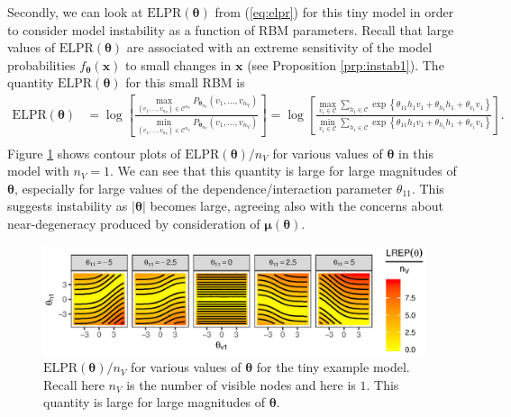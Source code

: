 \documentclass[12pt]{article}
\theoremstyle{definition}
\newcommand{\nv}{{n_{\scriptscriptstyle V}}}
\begin{document}
Secondly, we can look at \(\text{ELPR}(\boldsymbol \theta)\) from
(\eqref{eq:elpr}) for this tiny model in order to consider model
instability as a function of RBM parameters. Recall that large values of
\(\text{ELPR}(\boldsymbol \theta)\) are associated with an extreme
sensitivity of the model probabilities
\(f_{\boldsymbol \theta}(\boldsymbol x)\) to small changes in
\(\boldsymbol x\) (see Proposition \ref{prp:instab1}). The quantity
\(\text{ELPR}(\boldsymbol \theta)\) for this small RBM is
\begin{align*}
\text{ELPR}(\boldsymbol \theta) &= \log \left[\frac{\max\limits_{(v_1, \dots, v_\nv) \in \mathcal{C}^\nv}P_{\boldsymbol \theta_\nv}(v_1, \dots, v_\nv)}{\min\limits_{(v_1, \dots, v_\nv) \in \mathcal{C}^\nv}P_{\boldsymbol \theta_\nv}(v_1, \dots, v_\nv)}\right] = \log \left[\frac{\max\limits_{v_1 \in \mathcal{C}}\sum\limits_{h_1 \in \mathcal{C}}\exp\left\{\theta_{11} h_1 v_1 + \theta_{h_1}h_1 + \theta_{v_1} v_1 \right\}}{\min\limits_{v_1 \in \mathcal{C}}\sum\limits_{h_1 \in \mathcal{C}}\exp\left\{\theta_{11} h_1 v_1 + \theta_{h_1}h_1 + \theta_{v_1} v_1 \right\}}\right]. \\
\end{align*}
Figure \ref{fig:instab} shows contour plots of
\(\text{ELPR}(\boldsymbol \theta)/\nv\) for various values of
\(\boldsymbol \theta\) in this model with \(\nv = 1\). We can see that
this quantity is large for large magnitudes of \(\boldsymbol \theta\),
especially for large values of the dependence/interaction parameter
\(\theta_{11}\). This suggests instability as \(|\boldsymbol \theta|\)
becomes large, agreeing also with the concerns about near-degeneracy
produced by consideration of \(\boldsymbol \mu(\boldsymbol \theta)\).
\par
\begin{figure}

{\centering \includegraphics{paper_files/figure-latex/instab-1} 

}

\caption{$\text{ELPR}(\boldsymbol \theta)/\nv$ for various values of $\boldsymbol \theta$ for the tiny example model. Recall here $\nv$ is the number of visible nodes and here is $1$. This quantity is large for large magnitudes of $\boldsymbol \theta$.}\label{fig:instab}
\end{figure}
\end{document}
